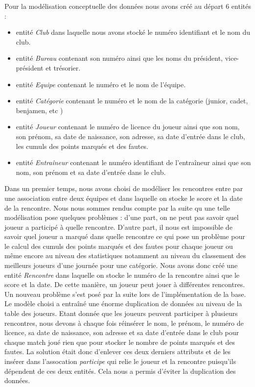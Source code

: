 \documentclass{article}
\begin{document}
Pour la modélisation conceptuelle des données nous avons créé au départ 6 entités : \\


\begin{itemize}
\item entité \textit{Club} dans laquelle nous avons stocké le numéro identifiant et le nom du club.
\item entité \textit{Bureau} contenant son numéro ainsi que les noms du président, vice-président et trésorier. 
\item entité \textit{Equipe} contenant le numéro et le nom de l'équipe.
\item entité \textit{Catégorie} contenant le numéro et le nom de la catégorie (junior, cadet, benjamen, etc )
\item entité \textit{Joueur} contenant le numéro de licence du joueur ainsi que son nom, son prénom, sa date de naissance, son adresse, sa date d'entrée dans le club, les cumuls des points marqués et des fautes.
\item entité \textit{Entraîneur} contenant le numéro identifiant de l'entraîneur ainsi que son nom, son prénom et sa date d'entrée dans le club. \\
\end{itemize}



Dans un premier temps, nous avons choisi de modéliser les rencontres entre par une association entre deux équipes et dans laquelle on stocke le score et la date de la rencontre. Nous nous sommes rendus compte par la suite qu une telle modélisation pose quelques problèmes : d'une part, on ne peut pas savoir quel joueur a participé à quelle rencontre. D'autre part, il nous est impossible de savoir quel joueur a marqué dans quelle rencontre ce qui pose un problème pour le calcul des cumuls des points marqués et des fautes pour chaque joueur ou même encore au niveau des statistiques notamment au niveau du classement des meilleurs joueurs d'une journée pour une catégorie. Nous avons donc créé une entité \textit{Rencontre} dans laquelle on stocke le numéro de la rencontre ainsi que le score et la date. De cette manière, un joueur peut jouer à différentes rencontres.
\\

Un nouveau problème s'est posé par la suite lors de l'implémentation de la base. Le modèle choisi a entraîné une énorme duplication de données au niveau de la table des joueurs. Etant donnée que les joueurs peuvent participer à plusieurs rencontres, nous devons à chaque fois réinsérer le nom, le prénom, le numéro de licence, sa date de naissance, son adresse et sa date d'entrée dans le club pour chaque match joué rien que pour stocker le nombre de points marqués et des fautes. La solution était donc d'enlever ces deux derniers attributs et de les insérer dans l'assocation \textit{participe} qui relie le joueur et la rencontre puisqu'ils dépendent de ces deux entités. Cela nous a permis d'éviter la duplication des données.
\\
\end{document}
